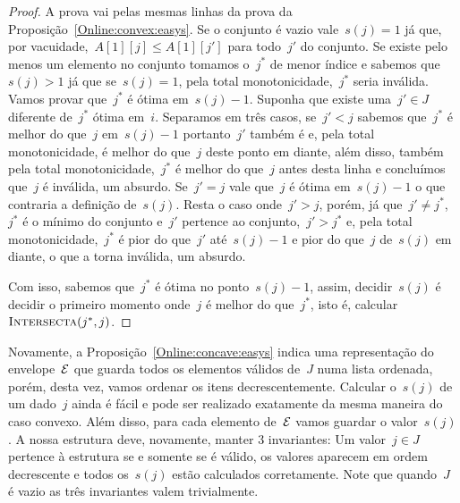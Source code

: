 \begin{proof}
A prova vai pelas mesmas linhas da prova da Proposição~\ref{Online:convex:easys}. Se o conjunto é vazio vale~$s(j) = 1$ já que, por vacuidade,~${ A[1][j] \leq A[1][j'] }$  para todo~$j'$ do conjunto. Se existe pelo menos um elemento no conjunto tomamos o~$j^*$ de menor índice e sabemos que~$s(j) > 1$ já que se~$s(j) = 1$, pela total monotonicidade,~$j^*$ seria inválida. Vamos provar que~$j^*$ é ótima em~$s(j) - 1$. Suponha que existe uma~$j' \in J$ diferente de~$j^*$ ótima em~$i$. Separamos em três casos, se~$j' < j$ sabemos que~$j^*$ é melhor do que~$j$ em~$s(j) - 1$ portanto~$j'$ também é e, pela total monotonicidade, é melhor do que~$j$ deste ponto em diante, além disso, também pela total monotonicidade,~$j^*$ é melhor do que~$j$ antes desta linha e concluímos que~$j$ é inválida, um absurdo. Se~$j' = j$ vale que~$j$ é ótima em~$s(j) - 1$ o que contraria a definição de~$s(j)$. Resta o caso onde~$j' > j$, porém, já que~$j' \neq j^*$,~$j^*$ é o mínimo do conjunto e~$j'$ pertence ao conjunto,~$j' > j^*$ e, pela total monotonicidade,~$j^*$ é pior do que~$j'$ até~$s(j)-1$ e pior do que~$j$ de~$s(j)$ em diante, o que a torna inválida, um absurdo.

Com isso, sabemos que~$j^*$ é ótima no ponto~$s(j) - 1$, assim, decidir~$s(j)$ é decidir o primeiro momento onde~$j$ é melhor do que~$j^*$, isto é, calcular~$\textsc{Intersecta}(j^*,j)$.
\end{proof}

Novamente, a Proposição~\ref{Online:concave:easys} indica uma representação do envelope~$\mathcal{E}$ que guarda todos os elementos válidos de~$J$ numa lista ordenada, porém, desta vez, vamos ordenar os itens decrescentemente. Calcular o~$s(j)$ de um dado~$j$ ainda é fácil e pode ser realizado exatamente da mesma maneira do caso convexo. Além disso, para cada elemento de~$\mathcal{E}$ vamos guardar o valor~$s(j)$. A nossa estrutura deve, novamente, manter 3 invariantes: Um valor~$j \in J$ pertence à estrutura se e somente se é válido, os valores aparecem em ordem decrescente e todos os~$s(j)$ estão calculados corretamente. Note que quando~$J$ é vazio as três invariantes valem trivialmente.

